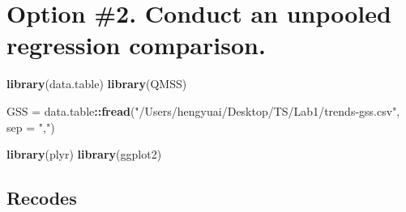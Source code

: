 \documentclass[]{article}
\title{}
\author{}
\date{}
\newenvironment{Shaded}{\begin{snugshade}}{\end{snugshade}}
\newcommand{\DataTypeTok}[1]{\textcolor[rgb]{0.13,0.29,0.53}{#1}}
\newcommand{\DecValTok}[1]{\textcolor[rgb]{0.00,0.00,0.81}{#1}}
\newcommand{\KeywordTok}[1]{\textcolor[rgb]{0.13,0.29,0.53}{\textbf{#1}}}
\newcommand{\NormalTok}[1]{#1}
\newcommand{\OperatorTok}[1]{\textcolor[rgb]{0.81,0.36,0.00}{\textbf{#1}}}
\newcommand{\StringTok}[1]{\textcolor[rgb]{0.31,0.60,0.02}{#1}}
\begin{document}
\hypertarget{option-2.-conduct-an-unpooled-regression-comparison.}{%
\section{Option \#2. Conduct an unpooled regression
comparison.}\label{option-2.-conduct-an-unpooled-regression-comparison.}}

\begin{Shaded}
\begin{Highlighting}[]
\KeywordTok{library}\NormalTok{(data.table)}
\KeywordTok{library}\NormalTok{(QMSS)}

\NormalTok{GSS =}\StringTok{ }\NormalTok{data.table}\OperatorTok{::}\KeywordTok{fread}\NormalTok{(}\StringTok{"/Users/hengyuai/Desktop/TS/Lab1/trends-gss.csv"}\NormalTok{,}
                        \DataTypeTok{sep =} \StringTok{","}\NormalTok{)}

\KeywordTok{library}\NormalTok{(plyr)}
\KeywordTok{library}\NormalTok{(ggplot2)}
\end{Highlighting}
\end{Shaded}

\hypertarget{recodes}{%
\subsection{Recodes}\label{recodes}}

\begin{Shaded}
\end{Shaded}
\end{document}

